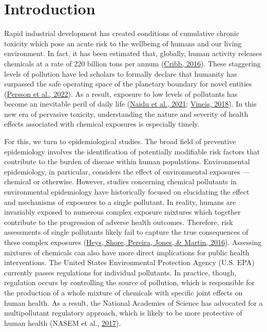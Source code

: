 \documentclass[12pt, twoside]{amherstthesis}
\begin{document}
\hypertarget{intro}{%
\chapter{Introduction}\label{intro}}

Rapid industrial development has created conditions of cumulative chronic toxicity which pose an acute risk to the wellbeing of humans and our living environment. In fact, it has been estimated that, globally, human activity releases chemicals at a rate of 220 billion tons per annum (\protect\hyperlink{ref-cribb_surviving_2016}{Cribb, 2016}). These staggering levels of pollution have led scholars to formally declare that humanity has surpassed the safe operating space of the planetary boundary for novel entities (\protect\hyperlink{ref-persson_outside_2022}{Persson et al., 2022}). As a result, exposure to low levels of pollutants has become an inevitable peril of daily life (\protect\hyperlink{ref-naidu_chemical_2021}{Naidu et al., 2021}; \protect\hyperlink{ref-vineis_john_2018}{Vineis, 2018}). In this new era of pervasive toxicity, understanding the nature and severity of health effects associated with chemical exposures is especially timely.

For this, we turn to epidemiological studies. The broad field of preventive epidemiology involves the identification of potentially modifiable risk factors that contribute to the burden of disease within human populations. Environmental epidemiology, in particular, considers the effect of environmental exposures --- chemical or otherwise. However, studies concerning chemical pollutants in environmental epidemiology have historically focused on elucidating the effect and mechanisms of exposures to a single pollutant. In reality, humans are invariably exposed to numerous complex exposure mixtures which together contribute to the progression of adverse health outcomes. Therefore, risk assessments of single pollutants likely fail to capture the true consequences of these complex exposures (\protect\hyperlink{ref-heys_risk_2016}{Heys, Shore, Pereira, Jones, \& Martin, 2016}). Assessing mixtures of chemicals can also have more direct implications for public health interventions. The United States Environmental Protection Agency (U.S. EPA) currently passes regulations for individual pollutants. In practice, though, regulation occurs by controlling the source of pollution, which is responsible for the production of a whole mixture of chemicals with specific joint effects on human health. As a result, the National Academies of Science has advocated for a multipollutant regulatory approach, which is likely to be more protective of human health (NASEM et al., \protect\hyperlink{ref-national_academies_of_sciences_engineering_and_medicine_using_2017}{2017}).
\end{document}
